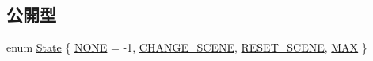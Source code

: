 \subsection*{公開型}
\begin{DoxyCompactItemize}
\item 
enum \mbox{\hyperlink{class_scene_manager_a68d32794fe1ce945c6a6c380c11a08eb}{State}} \{ \mbox{\hyperlink{class_scene_manager_a68d32794fe1ce945c6a6c380c11a08eba8cd4a237fa57487ca812c21216c5d77c}{N\+O\+NE}} = -\/1, 
\mbox{\hyperlink{class_scene_manager_a68d32794fe1ce945c6a6c380c11a08eba221613d2f5fb26ba3c9af4597df566fe}{C\+H\+A\+N\+G\+E\+\_\+\+S\+C\+E\+NE}}, 
\mbox{\hyperlink{class_scene_manager_a68d32794fe1ce945c6a6c380c11a08eba9e2198b05b1320b8aabfc855b8e81e82}{R\+E\+S\+E\+T\+\_\+\+S\+C\+E\+NE}}, 
\mbox{\hyperlink{class_scene_manager_a68d32794fe1ce945c6a6c380c11a08eba67b231706633f4d8aaadf6830078dd68}{M\+AX}}
 \}
\end{DoxyCompactItemize}
